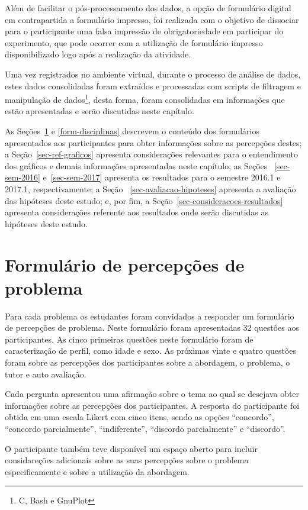 Além de facilitar o pós-processamento dos dados, a opção de
formulário digital em contrapartida a formulário impresso, foi
realizada com o objetivo de dissociar para o participante
uma falsa impressão de obrigatoriedade em participar do experimento,
que pode ocorrer com a utilização de formulário impresso disponibilizado
logo após a realização da atividade.


Uma vez registrados no ambiente virtual, durante o processo de análise de dados,
estes dados consolidadas foram extraídos e processadas com scripts de filtragem
e manipulação de dados\footnote{C, Bash e GnuPlot}, desta forma, foram consolidadas em informações que estão
apresentadas e serão discutidas neste capítulo.

As Seções~\ref{form-percepcoes} e \ref{form-disciplinas} descrevem
o conteúdo dos formulários apresentados aos participantes para obter
informações sobre as percepções destes;
a Seção~\ref{sec-ref-graficos} apresenta considerações relevantes para o
entendimento dos gráficos e demais informações apresentadas neste capítulo;
as Seções ~\ref{sec-sem-2016} e~\ref{sec-sem-2017}
apresenta os resultados para o semestre 2016.1 e 2017.1, respectivamente;
a Seção ~\ref{sec-avaliacao-hipoteses} apresenta a avaliação das
hipóteses deste estudo;
e, por fim, a Seção~\ref{sec-consideracoes-resultados} apresenta
considerações referente aos resultados onde serão discutidas
as hipóteses deste estudo.

\section{Formulário de percepções de problema}
\label{form-percepcoes}
Para cada problema os estudantes foram convidados a responder um formulário de percepções de problema.
Neste formulário foram apresentadas 32 questões aos participantes.
As cinco primeiras questões neste formulário foram de caracterização de perfil, como
idade e sexo.
As próximas vinte e quatro questões foram sobre as percepções dos participantes sobre a abordagem, o
problema, o tutor e auto avaliação.

Cada pergunta apresentou uma afirmação sobre o tema ao qual se desejava obter informações sobre as
percepções dos participantes.
A resposta do participante foi obtida em uma escala Likert com cinco itens, sendo as opções
``concordo'', ``concordo parcialmente'', ``indiferente'', ``discordo parcialmente'' e ``discordo''.

O participante também teve disponível um espaço aberto para incluir considareções adicionais sobre
as suas percepções sobre o problema especificamente e sobre a utilização da abordagem.

